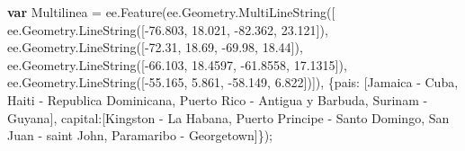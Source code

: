 \documentclass[
  12pt,
  letterpaper,
  twoside]{book}
\newenvironment{Shaded}{\begin{snugshade}}{\end{snugshade}}
\newcommand{\AttributeTok}[1]{\textcolor[rgb]{0.48,0.12,0.64}{#1}}
\newcommand{\ControlFlowTok}[1]{\textcolor[rgb]{0.00,0.00,0.00}{\textbf{#1}}}
\newcommand{\DataTypeTok}[1]{\textcolor[rgb]{0.00,0.00,0.00}{#1}}
\newcommand{\FloatTok}[1]{\textcolor[rgb]{0.28,0.53,0.93}{#1}}
\newcommand{\FunctionTok}[1]{\textcolor[rgb]{0.48,0.12,0.64}{#1}}
\newcommand{\KeywordTok}[1]{\textcolor[rgb]{0.48,0.12,0.64}{#1}}
\newcommand{\NormalTok}[1]{#1}
\newcommand{\OperatorTok}[1]{\textcolor[rgb]{0.00,0.00,0.00}{#1}}
\newcommand{\StringTok}[1]{\textcolor[rgb]{0.87,0.29,0.22}{#1}}
\begin{document}
\begin{Shaded}
\begin{Highlighting}[]
\ControlFlowTok{var}\NormalTok{ Multilinea }\OperatorTok{=} \KeywordTok{ee}\OperatorTok{.}\FunctionTok{Feature}\NormalTok{(}\KeywordTok{ee}\OperatorTok{.}\AttributeTok{Geometry}\OperatorTok{.}\FunctionTok{MultiLineString}\NormalTok{([  }
    \KeywordTok{ee}\OperatorTok{.}\AttributeTok{Geometry}\OperatorTok{.}\FunctionTok{LineString}\NormalTok{([}\OperatorTok{{-}}\FloatTok{76.803}\OperatorTok{,} \FloatTok{18.021}\OperatorTok{,} \OperatorTok{{-}}\FloatTok{82.362}\OperatorTok{,} \FloatTok{23.121}\NormalTok{])}\OperatorTok{,}      
    \KeywordTok{ee}\OperatorTok{.}\AttributeTok{Geometry}\OperatorTok{.}\FunctionTok{LineString}\NormalTok{([}\OperatorTok{{-}}\FloatTok{72.31}\OperatorTok{,} \FloatTok{18.69}\OperatorTok{,} \OperatorTok{{-}}\FloatTok{69.98}\OperatorTok{,} \FloatTok{18.44}\NormalTok{])}\OperatorTok{,}        
    \KeywordTok{ee}\OperatorTok{.}\AttributeTok{Geometry}\OperatorTok{.}\FunctionTok{LineString}\NormalTok{([}\OperatorTok{{-}}\FloatTok{66.103}\OperatorTok{,} \FloatTok{18.4597}\OperatorTok{,} \OperatorTok{{-}}\FloatTok{61.8558}\OperatorTok{,} \FloatTok{17.1315}\NormalTok{])}\OperatorTok{,}
    \KeywordTok{ee}\OperatorTok{.}\AttributeTok{Geometry}\OperatorTok{.}\FunctionTok{LineString}\NormalTok{([}\OperatorTok{{-}}\FloatTok{55.165}\OperatorTok{,} \FloatTok{5.861}\OperatorTok{,} \OperatorTok{{-}}\FloatTok{58.149}\OperatorTok{,} \FloatTok{6.822}\NormalTok{])])}\OperatorTok{,}
\NormalTok{    \{}\DataTypeTok{pais}\OperatorTok{:}\NormalTok{  [}\StringTok{\textquotesingle{}Jamaica {-} Cuba\textquotesingle{}}\OperatorTok{,}
            \StringTok{\textquotesingle{}Haiti {-} Republica Dominicana\textquotesingle{}}\OperatorTok{,}
            \StringTok{\textquotesingle{}Puerto Rico {-} Antigua y Barbuda\textquotesingle{}}\OperatorTok{,}
            \StringTok{\textquotesingle{}Surinam {-} Guyana\textquotesingle{}}\NormalTok{]}\OperatorTok{,}
    \DataTypeTok{capital}\OperatorTok{:}\NormalTok{[}\StringTok{\textquotesingle{}Kingston {-} La Habana\textquotesingle{}}\OperatorTok{,}
            \StringTok{\textquotesingle{}Puerto Principe {-} Santo Domingo\textquotesingle{}}\OperatorTok{,}
            \StringTok{\textquotesingle{}San Juan {-} saint John\textquotesingle{}}\OperatorTok{,}
            \StringTok{\textquotesingle{}Paramaribo {-} Georgetown\textquotesingle{}}\NormalTok{]\})}\OperatorTok{;}


\end{Highlighting}
\end{Shaded}
\end{document}
